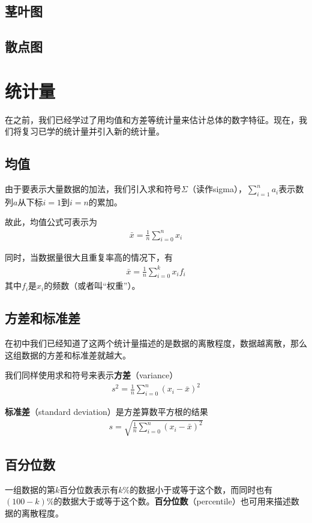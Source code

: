\subsection{茎叶图}
\subsection{散点图}

\section{统计量}
在之前，我们已经学过了用均值和方差等统计量来估计总体的数字特征。现在，我们将复习已学的统计量并引入新的统计量。

\subsection{均值}
由于要表示大量数据的加法，我们引入求和符号$\Sigma$（读作sigma），${\displaystyle\sum_{i=1}^n a_i}$表示数列$a$从下标$i=1$到$i=n$的累加。

故此，均值公式可表示为
\begin{gather}
	\bar{x}=\frac{1}{n}\sum_{i=0}^n x_i \label{equ:mean-1}
\end{gather}

同时，当数据量很大且重复率高的情况下，有
\begin{gather}
	\bar{x}=\frac{1}{n}\sum_{i=0}^k x_if_i \label{equ:mean-2}
\end{gather}
其中$f_i$是$x_i$的频数（或者叫“权重”）。

\subsection{方差和标准差}
在初中我们已经知道了这两个统计量描述的是数据的离散程度，数据越离散，那么这组数据的方差和标准差就越大。

我们同样使用求和符号来表示\textbf{方差}（variance）
\begin{gather}
	s^2=\frac{1}{n}\sum_{i=0}^{n} (x_i-\bar{x})^2 \label{equ:variance}
\end{gather}

\textbf{标准差}（standard deviation）是方差算数平方根的结果
\begin{gather}
	s=\sqrt{\frac{1}{n}\sum_{i=0}^{n} (x_i-\bar{x})^2} \label{equ:standard-deviation}
\end{gather}

\subsection{百分位数}
一组数据的第$k$百分位数表示有$k\%$的数据小于或等于这个数，而同时也有$(100-k)\%$的数据大于或等于这个数。\textbf{百分位数}（percentile）也可用来描述数据的离散程度。

